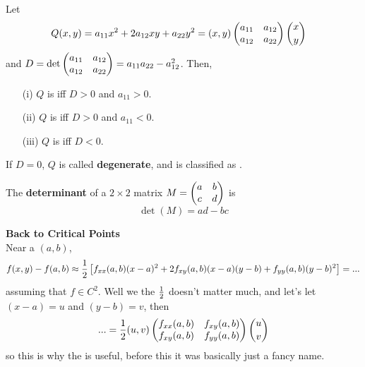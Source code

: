 \documentclass[english, 11pt]{article}
\begin{document}
\begin{thrm}\label{matrixdef}
  Let
  \begin{align*}
    Q(x,y) & = a_{11}x^2 + 2a_{12}xy + a_{22}y^2 = (x,y)\left( \begin{matrix} a_{11} & a_{12} \\ a_{12} & a_{22} \end{matrix} \right) {x \choose y}
  \end{align*}
  and $D = \det \left( \begin{matrix}  a_{11} & a_{12} \\ a_{12} & a_{22}  \end{matrix} \right) = a_{11}a_{22}-a_{12}^2$. Then,
  \begin{itemize}
    \item[(i)] $Q$ is  iff $D > 0$ and $a_{11} > 0$.
    \item[(ii)] $Q$ is  iff $D > 0$ and $a_{11} < 0$.
    \item[(iii)] $Q$ is  iff $D < 0$.
  \end{itemize}
  If $D = 0$, $Q$ is called \textbf{degenerate}, and is classified as .
\end{thrm}

\begin{defn}[determinant]\label{determinant}
The \textbf{determinant} of a $2\times 2$ matrix $M = \left( \begin{matrix} a & b \\ c & d \end{matrix} \right)$ is
\[ \det(M) = ad - bc \]
\end{defn}

\textbf{Back to Critical Points} \\

Near a  $(a,b)$, \[f(x,y) - f(a,b) \approx \frac{1}{2} \left[ f_{xx}(a,b)(x-a)^2 + 2f_{xy}(a,b)(x-a)(y-b) + f_{yy}(a,b)(y-b)^2 \right] = ...\] assuming that $f \in C^2$. Well we the $\frac{1}{2}$ doesn't matter much, and let's let $(x-a) = u$ and $(y-b) = v$, then
\[ ... = \frac{1}{2} (u,v) \left( \begin{matrix} f_{xx}(a,b) & f_{xy}(a,b) \\ f_{xy}(a,b) & f_{yy}(a,b) \end{matrix} \right) {u \choose v} \]
so this is why the  is useful, before this it was basically just a fancy name.
\end{document}
